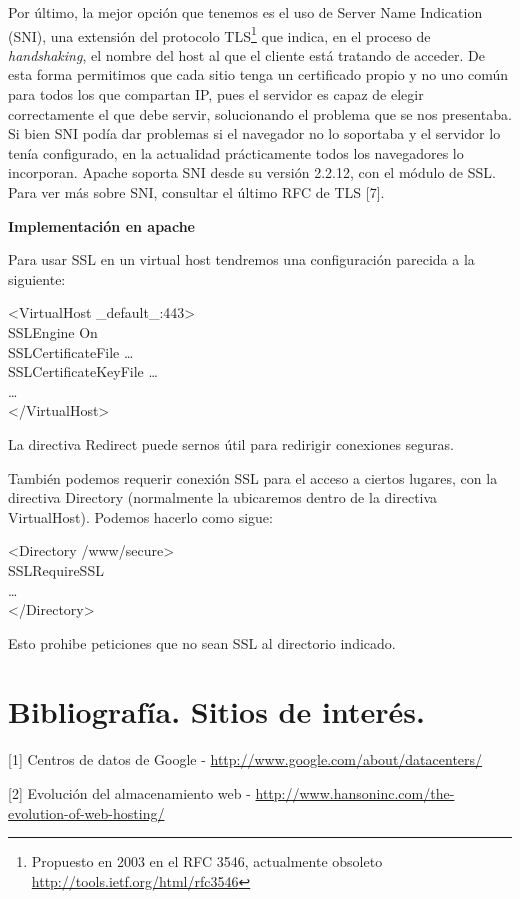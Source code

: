 \documentclass[a4paper, 10pt]{article} %
\begin{document}
Por último, la mejor opción que tenemos es el uso de Server Name Indication (SNI), una extensión del protocolo TLS\footnote{Propuesto en 2003 en el RFC 3546, actualmente obsoleto \url{http://tools.ietf.org/html/rfc3546}} que indica, en el proceso de \textit{handshaking}, el nombre del host al que el cliente está tratando de acceder. De esta forma permitimos que cada sitio tenga un certificado propio y no uno común para todos los que compartan IP, pues el servidor es capaz de elegir correctamente el que debe servir, solucionando el problema que se nos presentaba. Si bien SNI podía dar problemas si el navegador no lo soportaba y el servidor lo tenía configurado, en la actualidad prácticamente todos los navegadores lo incorporan. Apache soporta SNI desde su versión 2.2.12, con el módulo de SSL. \\
Para ver más sobre SNI, consultar el último RFC de TLS [7].

\textbf{Implementación en apache}

Para usar SSL en un virtual host tendremos una configuración parecida a la siguiente: 

<VirtualHost \_default\_:443>\\
	SSLEngine On\\
	SSLCertificateFile    \dots\\
	SSLCertificateKeyFile \dots\\
	\dots\\
</VirtualHost> 

La directiva Redirect puede sernos útil para redirigir conexiones seguras. 

También podemos requerir conexión SSL para el acceso a ciertos lugares, con la directiva Directory (normalmente la ubicaremos dentro de la directiva VirtualHost). Podemos hacerlo como sigue:

<Directory /www/secure>\\
	SSLRequireSSL\\
	\dots\\
</Directory>

Esto prohibe peticiones que no sean SSL al directorio indicado. 

\section{Bibliografía. Sitios de interés.}

[1] Centros de datos de Google - \url{http://www.google.com/about/datacenters/}

[2] Evolución del almacenamiento web - \url{http://www.hansoninc.com/the-evolution-of-web-hosting/}
\end{document}
